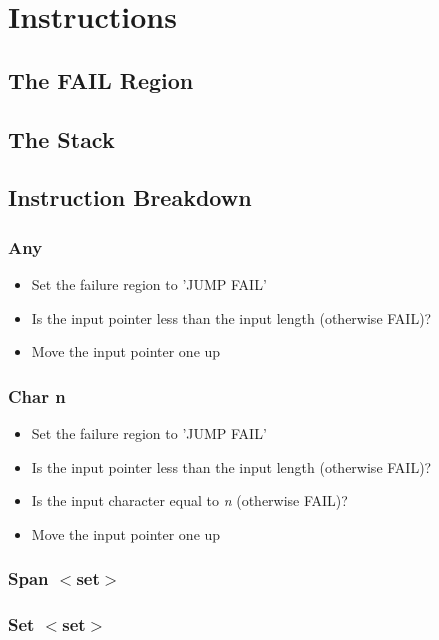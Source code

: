 \section{Instructions}

\subsection{The FAIL Region}

\subsection{The Stack}

\subsection{Instruction Breakdown}

\subsubsection{Any}

\begin{itemize}
\item Set the failure region to 'JUMP FAIL'
\item Is the input pointer less than the input length (otherwise FAIL)?
\item Move the input pointer one up
\end{itemize}

\subsubsection{Char n}

\begin{itemize}
\item Set the failure region to 'JUMP FAIL'
\item Is the input pointer less than the input length (otherwise FAIL)?
\item Is the input character equal to \textit{n} (otherwise FAIL)?
\item Move the input pointer one up
\end{itemize}

\subsubsection{Span $<$set$>$}

\subsubsection{Set $<$set$>$}

